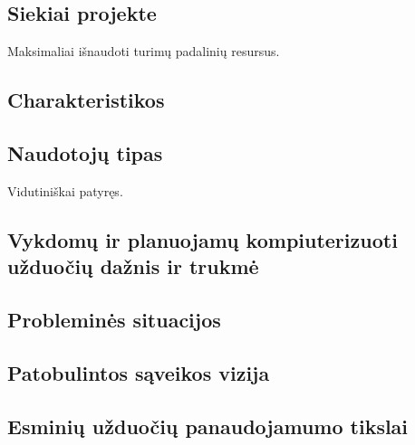 \subsection{Siekiai projekte}
Maksimaliai išnaudoti turimų padalinių resursus.

\subsection{Charakteristikos}
\xchars
{
}

\subsection{Naudotojų tipas}
Vidutiniškai patyręs.

\subsection{Vykdomų ir planuojamų kompiuterizuoti užduočių dažnis ir trukmė}
\xtasks
{
}


\subsection{Probleminės situacijos}
\subsection{Patobulintos sąveikos vizija}
\subsection{Esminių užduočių panaudojamumo tikslai}

